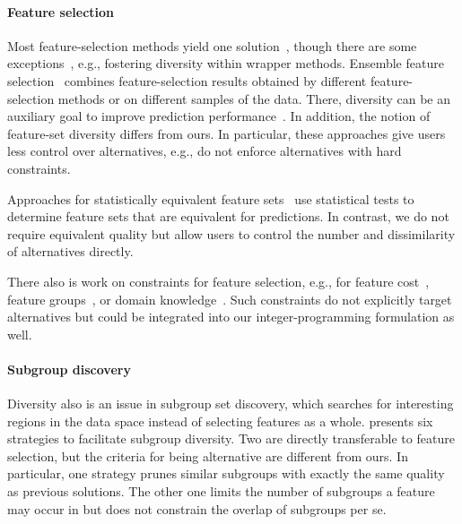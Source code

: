 \documentclass[iicol, sn-basic, Numbered]{sn-jnl} %
\theoremstyle{plain}
\theoremstyle{definition}
\begin{document}
\paragraph{Feature selection}

Most feature-selection methods yield one solution~\cite{borboudakis2021extending}, though there are some exceptions~\cite{emmanouilidis1999selecting, mueller2021feature, siddiqi2020genetic}, e.g., fostering diversity within wrapper methods.
Ensemble feature selection~\cite{saeys2008robust, seijo2017ensemble} combines feature-selection results obtained by different feature-selection methods or on different samples of the data.
There, diversity can be an auxiliary goal to improve prediction performance~\cite{guru2018alternative, liu2019subspace, woznica2012model}.
In addition, the notion of feature-set diversity differs from ours.
In particular, these approaches give users less control over alternatives, e.g., do not enforce alternatives with hard constraints.

Approaches for statistically equivalent feature sets~\cite{borboudakis2021extending, lagani2017feature} use statistical tests to determine feature sets that are equivalent for predictions.
In contrast, we do not require equivalent quality but allow users to control the number and dissimilarity of alternatives directly.

There also is work on constraints for feature selection, e.g., for feature cost~\cite{paclik2002feature}, feature groups~\cite{yuan2006model}, or domain knowledge~\cite{bach2022empirical, groves2015toward}.
Such constraints do not explicitly target alternatives but could be integrated into our integer-programming formulation as well.

\paragraph{Subgroup discovery}

Diversity also is an issue in subgroup set discovery, which searches for interesting regions in the data space instead of selecting features as a whole.
\cite{leeuwen2012diverse} presents six strategies to facilitate subgroup diversity. 
Two are directly transferable to feature selection, but the criteria for being alternative are different from ours.
In particular, one strategy prunes similar subgroups with exactly the same quality as previous solutions. 
The other one limits the number of subgroups a feature may occur in but does not constrain the overlap of subgroups per se.
\end{document}
